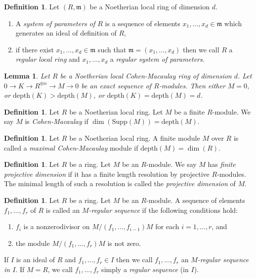\documentclass{amsart}
\theoremstyle{plain}
\newtheorem{lemma}[subsection]{Lemma}
\theoremstyle{definition}
\newtheorem{definition}[subsection]{Definition}
\theoremstyle{remark}
\numberwithin{equation}{subsection}
\begin{document}
\begin{definition}
\label{definition-regular-local}
Let $(R, \mathfrak m)$ be a Noetherian local ring of dimension $d$.
\begin{enumerate}
\item A {\it system of parameters of $R$} is a sequence of elements
$x_1, \ldots, x_d \in \mathfrak m$ which generates an ideal of
definition of $R$,
\item if there exist $x_1, \ldots, x_d \in \mathfrak m$
such that $\mathfrak m = (x_1, \ldots, x_d)$ then we call
$R$ a {\it regular local ring} and $x_1, \ldots, x_d$ a {\it regular
system of parameters}.
\end{enumerate}
\end{definition}

\begin{lemma}
\label{lemma-dimension-shift}
Let $R$ be a Noetherian local Cohen-Macaulay ring of dimension $d$.
Let $0 \to K \to R^{\oplus n} \to M \to 0$ be an exact sequence of
$R$-modules. Then either $M = 0$, or $\text{depth}(K) > \text{depth}(M)$, or
$\text{depth}(K) = \text{depth}(M) = d$.
\end{lemma}

\begin{definition}
\label{definition-CM}
Let $R$ be a Noetherian local ring.
Let $M$ be a finite $R$-module.
We say $M$ is {\it Cohen-Macaulay}
if $\dim(\text{Supp}(M)) = \text{depth}(M)$.
\end{definition}

\begin{definition}
\label{definition-maximal-CM}
Let $R$ be a Noetherian local ring.
A finite module $M$ over $R$ is called a {\it maximal Cohen-Macaulay}
module if $\text{depth}(M) = \dim(R)$.
\end{definition}

\begin{definition}
\label{definition-finite-proj-dim}
Let $R$ be a ring. Let $M$ be an $R$-module. We say $M$ has
{\it finite projective dimension} if it has a finite length
resolution by projective $R$-modules. The minimal length of such a
resolution is called the {\it projective dimension}
of $M$.
\end{definition}

\begin{definition}
\label{definition-regular-sequence}
Let $R$ be a ring. Let $M$ be an $R$-module. A sequence of elements
$f_1, \ldots, f_r$ of $R$ is called an {\it $M$-regular sequence}
if the following conditions hold:
\begin{enumerate}
\item $f_i$ is a nonzerodivisor on
$M/(f_1, \ldots, f_{i - 1})M$
for each $i = 1, \ldots, r$, and
\item the module $M/(f_1, \ldots, f_r)M$ is not zero.
\end{enumerate}
If $I$ is an ideal of $R$ and $f_1, \ldots, f_r \in I$
then we call $f_1, \ldots, f_r$ an {\it $M$-regular sequence
in $I$}. If $M = R$, we call $f_1, \ldots, f_r$ simply a
{\it regular sequence} (in $I$).
\end{definition}
\end{document}
